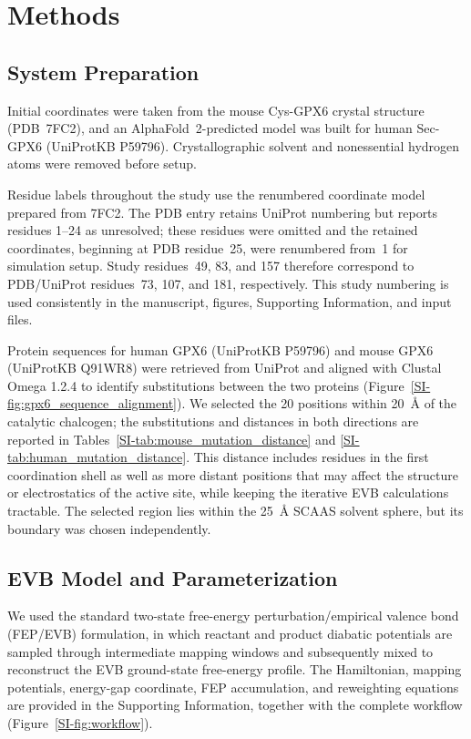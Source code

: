 \section{Methods}

\subsection{System Preparation}

Initial coordinates were taken from the mouse Cys-GPX6 crystal structure (PDB~7FC2), and an AlphaFold~2-predicted model was built for human Sec-GPX6 (UniProtKB P59796).\cite{PDB7FC2,jumper2021alphafold} 
Crystallographic solvent and nonessential hydrogen atoms were removed before setup. 

Residue labels throughout the study use the renumbered coordinate model prepared from 7FC2. The PDB entry retains UniProt numbering but reports residues 1--24 as unresolved; these residues were omitted and the retained coordinates, beginning at PDB residue~25, were renumbered from~1 for simulation setup. Study residues~49, 83, and 157 therefore correspond to PDB/UniProt residues~73, 107, and 181, respectively. This study numbering is used consistently in the manuscript, figures, Supporting Information, and input files.

Protein sequences for human GPX6 (UniProtKB P59796) and mouse GPX6 (UniProtKB Q91WR8) were retrieved from UniProt and aligned with Clustal Omega 1.2.4\cite{Sievers2011ClustalOmega} to identify substitutions between the two proteins (Figure~\ref{SI-fig:gpx6_sequence_alignment}). We selected the 20 positions within 20~\AA{} of the catalytic chalcogen; the substitutions and distances in both directions are reported in Tables~\ref{SI-tab:mouse_mutation_distance} and \ref{SI-tab:human_mutation_distance}. This distance includes residues in the first coordination shell as well as more distant positions that may affect the structure or electrostatics of the active site, while keeping the iterative EVB calculations tractable. The selected region lies within the 25~\AA{} SCAAS solvent sphere, but its boundary was chosen independently.

\subsection{EVB Model and Parameterization}

We used the standard two-state free-energy perturbation/empirical valence bond (FEP/EVB) formulation, in which reactant and product diabatic potentials are sampled through intermediate mapping windows and subsequently mixed to reconstruct the EVB ground-state free-energy profile. The Hamiltonian, mapping potentials, energy-gap coordinate, FEP accumulation, and reweighting equations are provided in the Supporting Information, together with the complete workflow (Figure~\ref{SI-fig:workflow}).\cite{warshel_empirical_1980,marelius_q_1999,oanca_efficient_2023}

